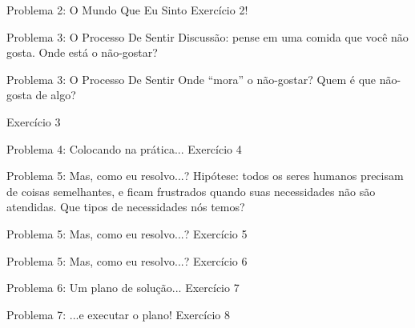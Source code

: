 \documentclass{beamer}
\begin{document}
\begin{frame}{Problema 2: O Mundo Que Eu Sinto}
  \Large
  Exercício 2!
\end{frame}

\begin{frame}{Problema 3: O Processo De Sentir}
  \Large
  Discussão: pense em uma comida que você não gosta. Onde está o não-gostar?
\end{frame}

\begin{frame}{Problema 3: O Processo De Sentir}
  \Large
  Onde ``mora'' o não-gostar? Quem é que não-gosta de algo?

  Exercício 3
\end{frame}

\begin{frame}{Problema 4: Colocando na prática...}
  \Large
  Exercício 4
\end{frame}

\begin{frame}{Problema 5: Mas, como eu resolvo...?}
  \LARGE
  Hipótese: todos os seres humanos precisam de coisas semelhantes, e ficam
  frustrados quando suas necessidades não são atendidas. Que tipos de
  necessidades nós temos?
\end{frame}

\begin{frame}{Problema 5: Mas, como eu resolvo...?}
  \Large
  Exercício 5
\end{frame}

\begin{frame}{Problema 5: Mas, como eu resolvo...?}
  \Large
  Exercício 6
\end{frame}

\begin{frame}{Problema 6: Um plano de solução...}
  \Large
  Exercício 7
\end{frame}

\begin{frame}{Problema 7: ...e executar o plano!}
  \Large
  Exercício 8
\end{frame}
\end{document}
